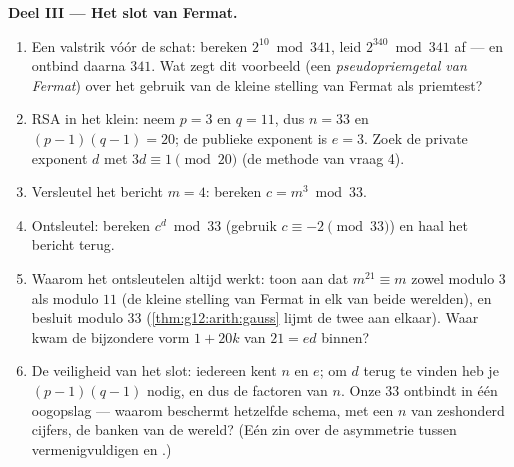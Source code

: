 \begin{problem}
\medskip
\noindent\textbf{Deel III --- Het slot van Fermat.}
\begin{enumerate}[resume]
  \item Een valstrik vóór de schat: bereken $2^{10} \bmod 341$, leid
        $2^{340} \bmod 341$ af --- en ontbind daarna $341$. Wat zegt dit
        voorbeeld (een \emph{pseudopriemgetal van Fermat}) over het gebruik van
        de kleine stelling van Fermat als priemtest?
  \item RSA in het klein: neem $p = 3$ en $q = 11$, dus $n = 33$ en
        $(p-1)(q-1) = 20$; de publieke exponent is $e = 3$. Zoek de private
        exponent $d$ met $3d \equiv 1 \pmod{20}$ (de methode van vraag 4).
  \item Versleutel het bericht $m = 4$: bereken $c = m^3 \bmod 33$.
  \item Ontsleutel: bereken $c^d \bmod 33$ (gebruik
        $c \equiv -2 \pmod{33}$) en haal het bericht terug.
  \item Waarom het ontsleutelen altijd werkt: toon aan dat
        $m^{21} \equiv m$ zowel modulo $3$ als modulo $11$ (de kleine stelling
        van Fermat in elk van beide werelden), en besluit modulo $33$
        (\cref{thm:g12:arith:gauss} lijmt de twee  aan elkaar).
        Waar kwam de bijzondere vorm $1 + 20k$ van $21 = ed$ binnen?
  \item De veiligheid van het slot: iedereen kent $n$ en $e$; om $d$ terug te
        vinden heb je $(p-1)(q-1)$ nodig, en dus de factoren van $n$. Onze $33$
        ontbindt in één oogopslag --- waarom beschermt hetzelfde schema, met
        een $n$ van zeshonderd cijfers, de banken van de wereld? (Eén zin over
        de asymmetrie tussen vermenigvuldigen en .)
\end{enumerate}


\end{problem}
